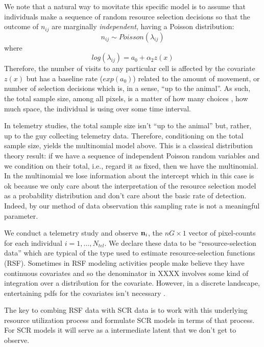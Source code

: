 We note that a natural way to movitate this specific model is to
assume that individuals make a sequence of random resource selection
decisions so that the outcome of $n_{ij}$ are marginally {\it
  independent}, having a Poisson distribution:
\[
 n_{ij} \sim Poisson( \lambda_{ij})
\]
where
\[
 log(\lambda_{ij}) = a_{0}  + \alpha_{2} z(x)
\]
Therefore, the number of visits to any particular cell is affected by
the covariate $z(x)$ but has a baseline rate ($exp(a_{0})$) related to the amount
of movement, or number of selection decisions which is,
in a sense,
``up to the animal''. As such, the total sample size, among all
pixels, is a matter of how many choices , how much  space, the
individual is using over some time interval.

In telemetry studies, the total sample size isn't ``up to the animal'' but, rather, up to
the guy collecting telemetry data. Therefore, conditioning on the
total sample size, yields the multinomial model above. This is a
classical distribution theory result: if we have a sequence of
independent Poisson random variables and we condition on their total,
i.e., regard it as fixed, then we have the multinomial. In the
multinomial we lose information about the intercept which in this case
is ok because we only care about the interpretation of the resource
selection model as a probability distribution and don't care about the
basic rate of detection. Indeed, by our method of data observation
this sampling rate is not a meaningful parameter. 


We conduct a telemetry study and observe ${\bf n}_{i}$, the $nG \times
1$ vector of pixel-counts for each individual $i=1,\ldots,N_{tel}$.
We declare these data to be ``resource-selection data'' which are
typical of the type used to estimate resource-selection functions
(RSF). Sometimes in RSF modeling activities people make believe they
have  continuous covariates and so the denominator in XXXX involves
some kind of integration over a distribution for the
covariate. However, in a discrete landscape, entertaining pdfs for the
covariates isn't necessary \citep{royle_etal:2012mee}. 


The key to combing RSF data with SCR data is to 
work with this underlying resource utilization process and formulate SCR
models in terms of that process. For SCR models it will serve as a
intermediate latent that we don't get to observe. 



